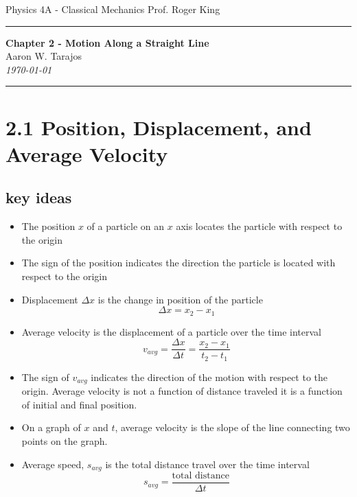 \documentclass{article}
\begin{document}
\noindent
Physics 4A - Classical Mechanics \hfill Prof. Roger King

\noindent\rule{\textwidth}{0.4pt}

\begin{center}
    \textbf{\LARGE Chapter 2 - Motion Along a Straight Line} \\
    \vspace{12pt}
    \large Aaron W. Tarajos \\
    \textit{\today}
\end{center}

\noindent\rule{\textwidth}{0.4pt}

\section*{2.1 Position, Displacement, and Average Velocity}
\subsection*{key ideas}
\begin{itemize}
	\item The position $x$ of a particle on an $x$ axis locates the particle with respect to the origin
	\item The sign of the position indicates the direction the particle is located with respect to the origin
	\item Displacement $\Delta x$ is the change in position of the particle
		\[
			\Delta x = x_2-x_1
		\]
	\item Average velocity is the displacement of a particle over the time interval
		\[
			v_{avg} = \frac{\Delta x}{\Delta t} = \frac{x_2 - x_1}{t_2 - t_1}
		\]
	\item The sign of $v_{avg}$ indicates the direction of the motion with respect to the origin. Average velocity is not a function of distance traveled it is a function of initial and final position.
	\item On a graph of $x$ and $t$, average velocity is the slope of the line connecting two points on the graph.
	\item Average speed, $s_{avg}$ is the total distance travel over the time interval
		\[
			s_{avg} = \frac{\text{total distance}}{\Delta t}
		\]
\end{itemize}
\end{document}
